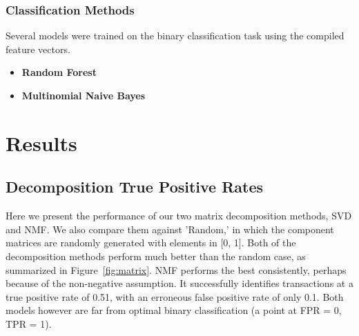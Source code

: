 \documentclass{article} %
\begin{document}
\subsubsection{Classification Methods}
Several models were trained on the binary classification task using the compiled feature vectors.
\begin{itemize}
	\item \textbf{Random Forest}
	\item \textbf{Multinomial Naive Bayes}
\end{itemize}



\section{Results}

\subsection{Decomposition True Positive Rates}

Here we present the performance of our two matrix decomposition methods, SVD and NMF. We also compare them against 'Random,' in which the component matrices are randomly generated with elements in [0, 1]. Both of the decomposition methods perform much better than the random case, as summarized in Figure~\ref{fig:matrix}. NMF performs the best consistently, perhaps because of the non-negative assumption. It successfully identifies transactions at a true positive rate of 0.51, with an erroneous false positive rate of only 0.1. Both models however are far from optimal binary classification (a point at FPR = 0, TPR = 1). 
\end{document}
